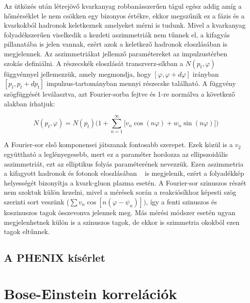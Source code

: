 \documentclass[10pt,a4paper]{article}
\numberwithin{equation}{subsection}
\numberwithin{figure}{section}
\begin{document}
Az ütközés után létrejövő kvarkanyag robbanásszerűen tágul egész addig amíg a hőmérséklet le nem csökken egy bizonyos értékre, ekkor megszűnik ez a fázis és a kvarkokból hadronok keletkeznek amelyeket mérni is tudunk. Mivel a kvarkanyag folyadékszerűen viselkedik a kezdeti aszimmetriák nem tűnnek el, a kifagyás pillanatába is jelen vannak, ezért azok a keletkező hadronok eloszlásában is megjelennek. Az aszimmetriákat jellemző paramétereket az impulzustérben szokás definiálni. A részecskék eloszlását transzverz-síkban a $N(p_t, \varphi)$ függvénnyel jellemezzük, amely megmondja, hogy $[\varphi, \varphi+d\varphi]$ irányban $[p_t, p_t+dp_t]$ impulzus-tartományban mennyi részecske található. A függvény szögfüggését leválasztva, azt Fourier-sorba fejtve és 1-re normálva a következő alakban írhatjuk:
 \begin{large}
\begin{equation}
N(p_t, \varphi)= N(p_t)\bigg(1+\sum_{n=1}^{\infty}\Big[v_n \cos(n\varphi)+w_n \sin(n\varphi)\Big]\bigg)
\label{eq:e3}
\end{equation}
\end{large}
A Fourier-sor első komponensei játszanak fontosabb szerepet. Ezek közül is a $v_2$ együttható a leglényegesebb, mert ez a paraméter hordozza az ellipszoidális aszimmetriát, ezt az elliptikus folyás paraméterének nevezzük. Ezen aszimmetria a kifagyott hadronok és fotonok eloszlásában ~\cite{Adare:2011zr} is megjelenik, ezért a folyadékkép helyességét bizonyítja a kvark-gluon plazma esetén.
A Fourier-sor szinuszos részét nem szoktuk külön kezelni, mivel a mérések során a reakciósíkhoz képesti szög szerinti sort veszünk ($\sum v_n \cos[n(\varphi-\psi_n)])$, így a fenti szinuszos és koszinuszos tagok összevonva jelennek meg. Más mérési módszer esetén ugyan megjelenhetnek külön is a szinuszos tagok, de ekkor is szimmetria okokból ezen tagok eltűnnek.


\subsection{A PHENIX kísérlet}



\section{Bose-Einstein korrelációk}
\end{document}
